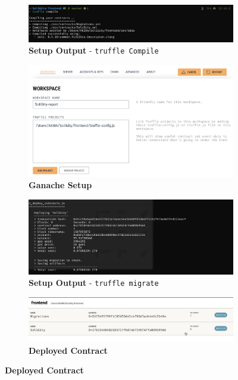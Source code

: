 \documentclass[12pt]{article}
\renewcommand{\_}{\kern-1.5pt\textunderscore\kern-1.5pt}
\begin{document}
\begin{minipage}[b]{0.5\textwidth}
	\begin{figure}[H]
		\centering
		\begin{subfigure}[b]{\textwidth}
			\centering
			\includegraphics[width=\textwidth]{graphs/05. truffle_compile}
			\caption{\textbf{Setup Output} - \texttt{truffle Compile}}
		\end{subfigure}
		\begin{subfigure}[b]{\textwidth}
			\centering
			\includegraphics[width=\textwidth]{graphs/06. ganache_setup}
			\caption{\textbf{Ganache Setup}}

		\end{subfigure}

		\begin{subfigure}[b]{\textwidth}
			\centering
			\includegraphics[width=\textwidth]{graphs/07. truffle_migrate}
			\caption{\textbf{Setup Output} - \texttt{truffle migrate}}
		\end{subfigure}
		\begin{subfigure}[b]{\textwidth}
			\centering
			\includegraphics[width=\textwidth]{graphs/08. ganache_deployed_contract}
			\caption{\textbf{Deployed Contract}}
		\end{subfigure}
		\label{fig:setup0}
	\end{figure}
\end{minipage}
\end{document}
